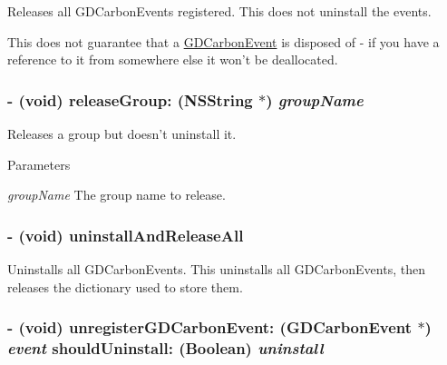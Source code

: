 Releases all GDCarbonEvents registered. This does not uninstall the events.

This does not guarantee that a \hyperlink{interface_g_d_carbon_event}{GDCarbonEvent} is disposed of -\/ if you have a reference to it from somewhere else it won't be deallocated. \hypertarget{interface_g_d_carbon_event_manager_a7959c7e44bc31f132278d2d5f10054cf}{
\subsubsection[{releaseGroup:}]{\setlength{\rightskip}{0pt plus 5cm}-\/ (void) releaseGroup: (NSString $\ast$) {\em groupName}}}
\label{interface_g_d_carbon_event_manager_a7959c7e44bc31f132278d2d5f10054cf}


Releases a group but doesn't uninstall it. 
\begin{DoxyParams}{Parameters}
\item[{\em groupName}]The group name to release. \end{DoxyParams}
\hypertarget{interface_g_d_carbon_event_manager_ab4b42a2fa05a8c48d8d99733f265d2c6}{
\subsubsection[{uninstallAndReleaseAll}]{\setlength{\rightskip}{0pt plus 5cm}-\/ (void) uninstallAndReleaseAll }}
\label{interface_g_d_carbon_event_manager_ab4b42a2fa05a8c48d8d99733f265d2c6}


Uninstalls all GDCarbonEvents. This uninstalls all GDCarbonEvents, then releases the dictionary used to store them. \hypertarget{interface_g_d_carbon_event_manager_a786c5f3fb13179cec26b22d240c5cc53}{
\subsubsection[{unregisterGDCarbonEvent:shouldUninstall:}]{\setlength{\rightskip}{0pt plus 5cm}-\/ (void) unregisterGDCarbonEvent: ({\bf GDCarbonEvent} $\ast$) {\em event}\/ shouldUninstall: (Boolean) {\em uninstall}}}
\label{interface_g_d_carbon_event_manager_a786c5f3fb13179cec26b22d240c5cc53}


